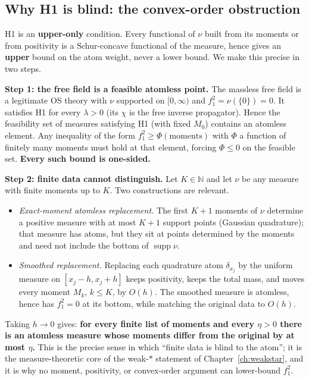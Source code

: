 \subsection{Why H1 is blind: the convex-order obstruction}
\label{sec:schur}

H1 is an \textbf{upper-only} condition. Every functional of $\nu$ built from its moments or from
positivity is a Schur-concave functional of the measure, hence gives an \textbf{upper} bound on
the atom weight, never a lower bound. We make this precise in two steps.

\textbf{Step 1: the free field is a feasible atomless point.} The massless free field is a
legitimate OS theory with $\nu$ supported on $[0,\infty)$ and $f_1^2=\nu(\{0\})=0$. It satisfies
H1 for every $\lambda>0$ (its $\chi$ is the free inverse propagator). Hence the feasibility set of
measures satisfying H1 (with fixed $M_0$) contains an atomless element. Any inequality of the form
$f_1^2\ge\Phi(\text{moments})$ with $\Phi$ a function of finitely many moments must hold at that
element, forcing $\Phi\le0$ on the feasible set. \textbf{Every such bound is one-sided.}

\textbf{Step 2: finite data cannot distinguish.} Let $K\in\mathbb{N}$ and let $\nu$ be any
measure with finite moments up to $K$. Two constructions are relevant.
\begin{itemize}
\item \emph{Exact-moment atomless replacement.} The first $K+1$ moments of $\nu$ determine a
  positive measure with at most $K+1$ support points (Gaussian quadrature); that measure has
  atoms, but they sit at points determined by the moments and need not include the bottom of
  $\operatorname{supp}\nu$.
\item \emph{Smoothed replacement.} Replacing each quadrature atom $\delta_{x_j}$ by the uniform
  measure on $[x_j-h,x_j+h]$ keeps positivity, keeps the total mass, and moves every moment
  $M_k$, $k\le K$, by $O(h)$. The smoothed measure is atomless, hence has $f_1^2=0$ at its
  bottom, while matching the original data to $O(h)$.
\end{itemize}
Taking $h\to0$ gives: \textbf{for every finite list of moments and every $\eta>0$ there is an
atomless measure whose moments differ from the original by at most $\eta$.} This is the precise
sense in which ``finite data is blind to the atom''; it is the measure-theoretic core of the
weak-$*$ statement of Chapter~\ref{ch:weakstar}, and it is why no moment, positivity, or
convex-order argument can lower-bound $f_1^2$.


